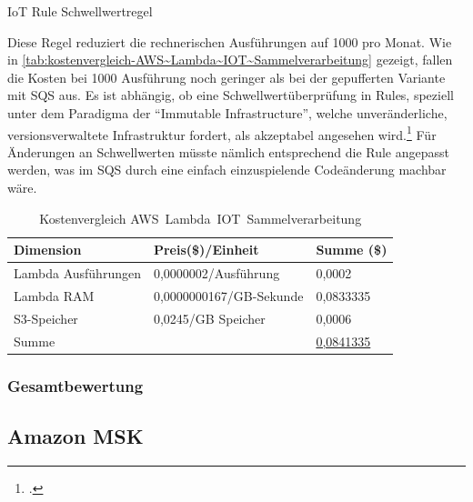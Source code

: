\begin{listing}[H]
\inputminted[frame=lines,breaklines=true]{sql}{code/iot-rules-lambda-filter.sql}
\caption{IoT Rule Schwellwertregel}
\label{listing:iot-rule-threshold}
\end{listing}
Diese Regel reduziert die rechnerischen Ausführungen auf 1000 pro Monat. Wie in \autoref{tab:kostenvergleich-AWS~Lambda~IOT~Sammelverarbeitung} gezeigt, fallen die Kosten bei 1000 Ausführung noch geringer als bei der gepufferten Variante mit \ac{SQS} aus. Es ist abhängig, ob eine Schwellwertüberprüfung in \AWSIOT{} Rules, speziell unter dem Paradigma der \enquote{Immutable Infrastructure}, welche unveränderliche, versionsverwaltete Infrastruktur fordert, als akzeptabel angesehen wird.\footcite[Vgl.][]{AmazonWebServicesInc..o.J.p} Für Änderungen an Schwellwerten müsste nämlich entsprechend die \AWSIOT{} Rule angepasst werden, was im \ac{SQS} durch eine einfach einzuspielende Codeänderung machbar wäre.

\begin{table}[H]
\centering
\begin{tabular}{|l|l|l|}
\hline
Dimension & Preis(\$)/Einheit & Summe (\$) \\ \hline
Lambda Ausführungen & 0,0000002/Ausführung & 0,0002 \\ \hline
Lambda \ac{RAM} & 0,0000000167/GB-Sekunde & 0,0833335 \\ \hline
\ac{S3}-Speicher & 0,0245/GB Speicher & 0,0006 \\ \hline
Summe & \cellcolor[HTML]{EFEFEF} & \underline{0,0841335} \\ \hline
\end{tabular}
\caption{Kostenvergleich AWS~Lambda~IOT~Sammelverarbeitung}
\label{tab:kostenvergleich-AWS~Lambda~IOT~Sammelverarbeitung}
\end{table}

\subsubsection{Gesamtbewertung}

\subsection{Amazon MSK}


